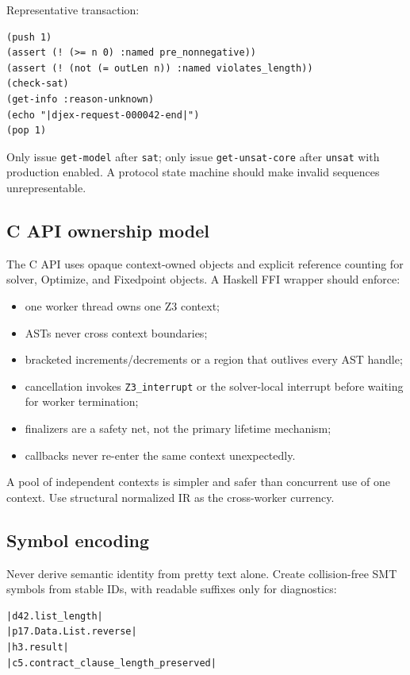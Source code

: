 \documentclass[11pt,oneside]{article}
\newcommand{\code}[1]{\texttt{#1}}
\begin{document}
Representative transaction:

\begin{lstlisting}[language=SMTLIB]
(push 1)
(assert (! (>= n 0) :named pre_nonnegative))
(assert (! (not (= outLen n)) :named violates_length))
(check-sat)
(get-info :reason-unknown)
(echo "|djex-request-000042-end|")
(pop 1)
\end{lstlisting}

Only issue \code{get-model} after \code{sat}; only issue \code{get-unsat-core} after
\code{unsat} with production enabled. A protocol state machine should make invalid
sequences unrepresentable.

\subsection{C API ownership model}

The C API uses opaque context-owned objects and explicit reference counting for solver,
Optimize, and Fixedpoint objects. A Haskell FFI wrapper should enforce:

\begin{itemize}
  \item one worker thread owns one Z3 context;
  \item ASTs never cross context boundaries;
  \item bracketed increments/decrements or a region that outlives every AST handle;
  \item cancellation invokes \code{Z3\_interrupt} or the solver-local interrupt before
        waiting for worker termination;
  \item finalizers are a safety net, not the primary lifetime mechanism;
  \item callbacks never re-enter the same context unexpectedly.
\end{itemize}

A pool of independent contexts is simpler and safer than concurrent use of one context.
Use structural normalized IR as the cross-worker currency.

\subsection{Symbol encoding}

Never derive semantic identity from pretty text alone. Create collision-free SMT symbols
from stable IDs, with readable suffixes only for diagnostics:

\begin{lstlisting}
|d42.list_length|
|p17.Data.List.reverse|
|h3.result|
|c5.contract_clause_length_preserved|
\end{lstlisting}
\end{document}
